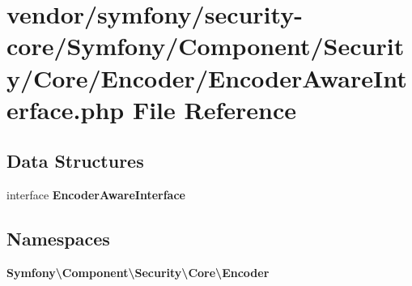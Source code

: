 \section{vendor/symfony/security-\/core/\+Symfony/\+Component/\+Security/\+Core/\+Encoder/\+Encoder\+Aware\+Interface.php File Reference}
\label{_encoder_aware_interface_8php}
\subsection*{Data Structures}
\begin{DoxyCompactItemize}
\item 
interface {\bf Encoder\+Aware\+Interface}
\end{DoxyCompactItemize}
\subsection*{Namespaces}
\begin{DoxyCompactItemize}
\item 
 {\bf Symfony\textbackslash{}\+Component\textbackslash{}\+Security\textbackslash{}\+Core\textbackslash{}\+Encoder}
\end{DoxyCompactItemize}
